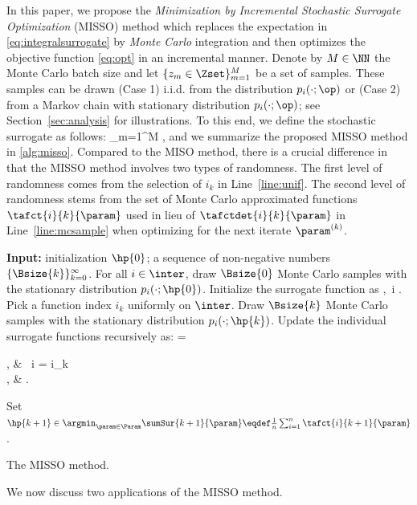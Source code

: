 \documentclass[final,12pt]{alt2022} %
\begin{document}
In this paper, we propose the \emph{Minimization by Incremental Stochastic Surrogate Optimization} (MISSO) method  which replaces the expectation in \eqref{eq:integralsurrogate} by \emph{Monte Carlo} integration and then optimizes the objective function \eqref{eq:opt} in an incremental manner.
Denote by $M \in \NN$ the Monte Carlo batch size and let $\{z_m \in \Zset\}_{m=1}^M$ be a set of samples. These samples can be drawn
{\sf (Case 1)} i.i.d. from the distribution $p_i( \cdot ; \op )$ or {\sf (Case 2)}  from a Markov chain with stationary distribution $p_{i}(\cdot; \op)$; see Section~\ref{sec:analysis} for illustrations.
To this end, we define the stochastic surrogate as follows:
\beq \label{eq:ssur}  
 \eqdef {} \sum_{m=1}^{M} \eqsp,
\eeq
and we summarize the proposed MISSO method in \ref{alg:misso}. Compared to the MISO method, there is a crucial difference in that 
the MISSO method involves two types of randomness.  The first level of randomness comes from the selection of $i_k$ in Line~\ref{line:unif}. 
The second level of randomness stems from the set of Monte Carlo approximated functions $\tafct{i}{k}{\param}$ used in lieu of $\tafctdet{i}{k}{\param}$ in Line~\ref{line:mcsample} when optimizing for the next iterate $\param^{(k)}$.
\begin{algorithm}[t]
\begin{algorithmic}[1]
\STATE \textbf{Input:} initialization $\hp{0}$; a sequence of non-negative numbers $\{ \Bsize{k} \}_{k=0}^\infty$.
\STATE For all $i \in \inter$, draw $\Bsize{0}$ Monte Carlo samples with the stationary distribution $p_i(\cdot; \hp{0})$.
\STATE Initialize the surrogate function as
\beq\notag
{} \eqdef {},~i \in \inter \eqsp. \vspace{-.2cm}
\eeq
{}
\STATE \label{line:unif}Pick a function index $i_k$ uniformly on $\inter$.
\STATE \label{line:mcsample} Draw $\Bsize{k}$ Monte Carlo samples with the stationary distribution $p_i(\cdot; \hp{k})$.
\STATE \label{line:ssur} Update the individual surrogate functions recursively as:
\beq\notag
{} = \begin{cases}
, & ~i = i_k \\
, & .
\end{cases}
\eeq
\STATE \label{line:iter} Set $\hp{k+1} \in \argmin_{ \param \in \Param } \sumSur{k+1}{\param} \eqdef  \frac{1}{n} \sum_{i=1}^n \tafct{i}{k+1}{\param}$.
\ENDFOR
\end{algorithmic}
\caption{The MISSO method.}
\label{alg:misso}
        \end{algorithm}
We now discuss two applications of the MISSO method.
\end{document}
